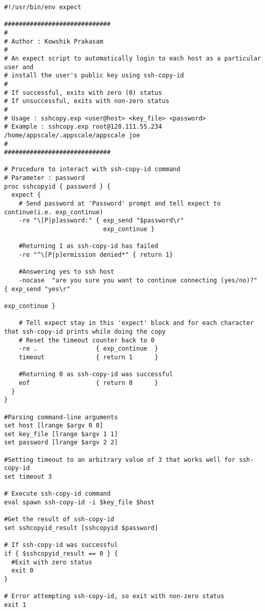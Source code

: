 \begin{lstlisting}
#!/usr/bin/env expect

#############################
#
# Author : Kowshik Prakasam
#
# An expect script to automatically login to each host as a particular user and 
# install the user's public key using ssh-copy-id
#
# If successful, exits with zero (0) status 
# If unsuccessful, exits with non-zero status
#
# Usage : sshcopy.exp <user@host> <key_file> <password>
# Example : sshcopy.exp root@128.111.55.234 /home/appscale/.appscale/appscale joe
#
#############################

# Procedure to interact with ssh-copy-id command
# Parameter : password 
proc sshcopyid { password } {
  expect {
    # Send password at 'Password' prompt and tell expect to continue(i.e. exp_continue)
    -re "\[P|p]assword:" { exp_send "$password\r"
                           exp_continue }

    #Returning 1 as ssh-copy-id has failed
    -re "^\[P|p]ermission denied*" { return 1}
                           
    #Answering yes to ssh host 
    -nocase  "are you sure you want to continue connecting (yes/no)?" { exp_send "yes\r"
    	    	      	       	   	   	    	       		    exp_continue }
            
    # Tell expect stay in this 'expect' block and for each character that ssh-copy-id prints while doing the copy
    # Reset the timeout counter back to 0
    -re .                { exp_continue  }
    timeout              { return 1      }
    
    #Returning 0 as ssh-copy-id was successful
    eof                  { return 0      }
  }
}

#Parsing command-line arguments
set host [lrange $argv 0 0]
set key_file [lrange $argv 1 1]
set password [lrange $argv 2 2]

#Setting timeout to an arbitrary value of 3 that works well for ssh-copy-id
set timeout 3

# Execute ssh-copy-id command
eval spawn ssh-copy-id -i $key_file $host

#Get the result of ssh-copy-id
set sshcopyid_result [sshcopyid $password]

# If ssh-copy-id was successful
if { $sshcopyid_result == 0 } {
  #Exit with zero status
  exit 0
}

# Error attempting ssh-copy-id, so exit with non-zero status
exit 1
\end{lstlisting}


